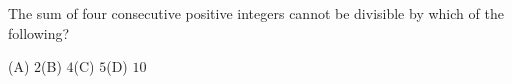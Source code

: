 The sum of four consecutive positive integers cannot be divisible by which of the following?

(A) $2$\qquad (B) $4$\qquad (C) $5$\qquad (D) $10$
